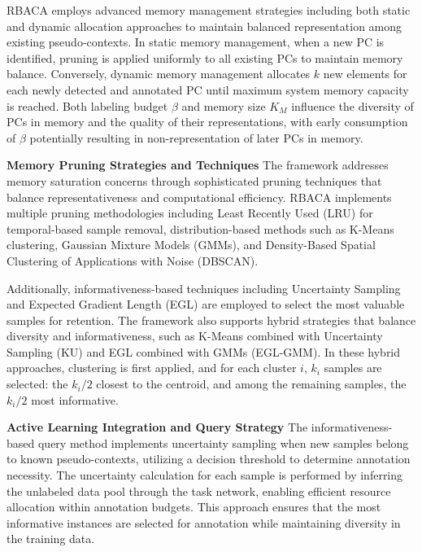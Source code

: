 \documentclass{IEEEcsmag}
\begin{document}
    RBACA employs advanced memory management strategies including both static and dynamic allocation approaches to maintain balanced representation among existing pseudo-contexts\cite{cite-19}.
    In static memory management, when a new PC is identified, pruning is applied uniformly to all existing PCs to maintain memory balance.
    Conversely, dynamic memory management allocates $k$ new elements for each newly detected and annotated PC until maximum system memory capacity is reached.
    Both labeling budget $\beta$ and memory size $K_M$ influence the diversity of PCs in memory and the quality of their representations, with early consumption of $\beta$ potentially resulting in non-representation of later PCs in memory\cite{cite-19}.
    
    \textbf{Memory Pruning Strategies and Techniques}\newline
    The framework addresses memory saturation concerns through sophisticated pruning techniques that balance representativeness and computational efficiency.
    RBACA implements multiple pruning methodologies including Least Recently Used (LRU) for temporal-based sample removal, distribution-based methods such as K-Means clustering, Gaussian Mixture Models (GMMs), and Density-Based Spatial Clustering of Applications with Noise (DBSCAN)\cite{cite-19}.
    
    Additionally, informativeness-based techniques including Uncertainty Sampling and Expected Gradient Length (EGL) are employed to select the most valuable samples for retention.
    The framework also supports hybrid strategies that balance diversity and informativeness, such as K-Means combined with Uncertainty Sampling (KU) and EGL combined with GMMs (EGL-GMM)\cite{cite-19}.
    In these hybrid approaches, clustering is first applied, and for each cluster $i$, $k_i$ samples are selected: the $k_i/2$ closest to the centroid, and among the remaining samples, the $k_i/2$ most informative.
    
    \textbf{Active Learning Integration and Query Strategy}\newline
    The informativeness-based query method implements uncertainty sampling when new samples belong to known pseudo-contexts, utilizing a decision threshold to determine annotation necessity\cite{cite-19}.
    The uncertainty calculation for each sample is performed by inferring the unlabeled data pool through the task network, enabling efficient resource allocation within annotation budgets.
    This approach ensures that the most informative instances are selected for annotation while maintaining diversity in the training data.
    
\end{document}
